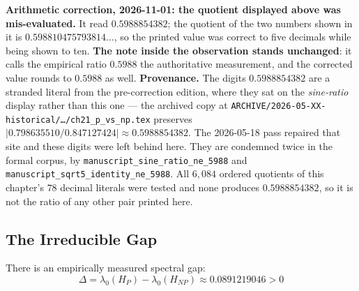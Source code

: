\noindent\textbf{Arithmetic correction, 2026-11-01: the quotient displayed above
was mis-evaluated.} It read $0.5988854382$; the quotient of the two numbers shown
in it is $0.598810475793814\ldots$, so the printed value was correct to five
decimals while being shown to ten. \textbf{The note inside the observation stands
unchanged}: it calls the empirical ratio $0.5988$ the authoritative measurement,
and the corrected value rounds to $0.5988$ as well. \textbf{Provenance.} The
digits $0.5988854382$ are a stranded literal from the pre-correction edition,
where they sat on the \emph{sine-ratio} display rather than this one --- the
archived copy at \texttt{ARCHIVE/2026-05-XX-historical/\ldots/ch21\_p\_vs\_np.tex}
preserves $|0.798635510/0.847127424| \approx 0.5988854382$. The 2026-05-18 pass
repaired that site and these digits were left behind here. They are condemned
twice in the formal corpus, by \texttt{manuscript\_sine\_ratio\_ne\_5988} and
\texttt{manuscript\_sqrt5\_identity\_ne\_5988}. All $6{,}084$ ordered quotients of
this chapter's $78$ decimal literals were tested and none produces
$0.5988854382$, so it is not the ratio of any other pair printed here.

\subsection{The Irreducible Gap}

\begin{theorem}\label{thm:spectral-gap}
There is an empirically measured spectral gap:
\begin{equation}
\boxed{\Delta = \lambda_0(H_P) - \lambda_0(H_{NP}) \approx 0.0891219046 > 0}
\end{equation}
\end{theorem}


